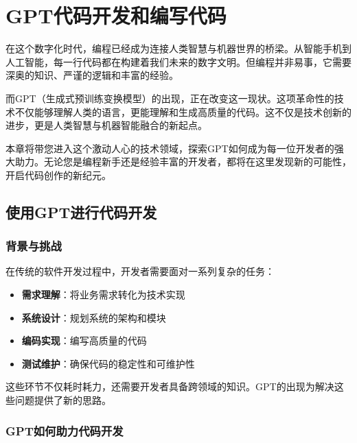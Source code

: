 \hypertarget{gptux4ee3ux7801ux5f00ux53d1ux548cux7f16ux5199ux4ee3ux7801}{%
\section{GPT代码开发和编写代码}\label{gptux4ee3ux7801ux5f00ux53d1ux548cux7f16ux5199ux4ee3ux7801}}


在这个数字化时代，编程已经成为连接人类智慧与机器世界的桥梁。从智能手机到人工智能，每一行代码都在构建着我们未来的数字文明。但编程并非易事，它需要深奥的知识、严谨的逻辑和丰富的经验。

而GPT（生成式预训练变换模型）的出现，正在改变这一现状。这项革命性的技术不仅能够理解人类的语言，更能理解和生成高质量的代码。这不仅是技术创新的进步，更是人类智慧与机器智能融合的新起点。

本章将带您进入这个激动人心的技术领域，探索GPT如何成为每一位开发者的强大助力。无论您是编程新手还是经验丰富的开发者，都将在这里发现新的可能性，开启代码创作的新纪元。

\hypertarget{ux4f7fux7528gptux8fdbux884cux4ee3ux7801ux5f00ux53d1}{%
\subsection{使用GPT进行代码开发}\label{ux4f7fux7528gptux8fdbux884cux4ee3ux7801ux5f00ux53d1}}

\hypertarget{ux80ccux666fux4e0eux6311ux6218}{%
\subsubsection{背景与挑战}\label{ux80ccux666fux4e0eux6311ux6218}}

在传统的软件开发过程中，开发者需要面对一系列复杂的任务：

\begin{itemize}
\item
  \textbf{需求理解}：将业务需求转化为技术实现
\item
  \textbf{系统设计}：规划系统的架构和模块
\item
  \textbf{编码实现}：编写高质量的代码
\item
  \textbf{测试维护}：确保代码的稳定性和可维护性
\end{itemize}

这些环节不仅耗时耗力，还需要开发者具备跨领域的知识。GPT的出现为解决这些问题提供了新的思路。

\hypertarget{gptux5982ux4f55ux52a9ux529bux4ee3ux7801ux5f00ux53d1}{%
\subsubsection{GPT如何助力代码开发}\label{gptux5982ux4f55ux52a9ux529bux4ee3ux7801ux5f00ux53d1}}

